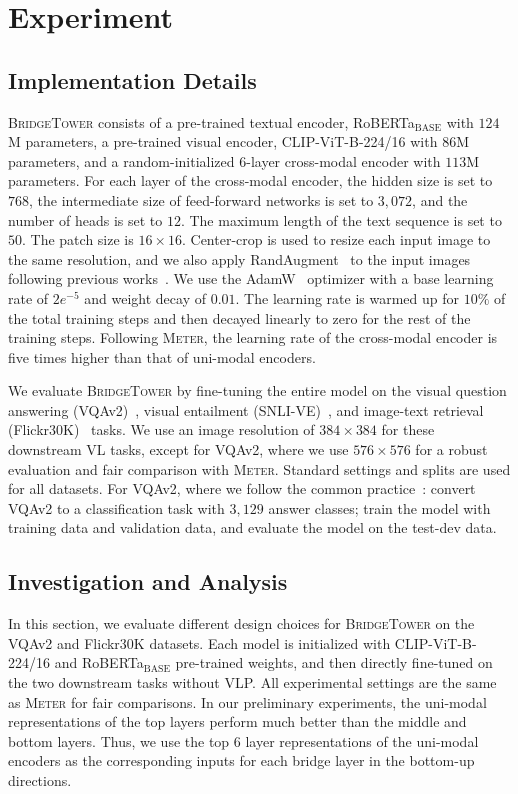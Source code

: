 \documentclass[letterpaper]{article} %
\newcommand{\methodname}[0]{\textsc{BridgeTower}}
\newcommand{\modelbase}[0]{$_{\text{BASE}}$}
\newcommand{\metername}[0]{\textsc{Meter}}
\begin{document}
\section{Experiment}

\subsection{Implementation Details}
\label{sec:implementation_details}
\methodname{} consists of a pre-trained textual encoder, RoBERTa\modelbase{} with $124$M parameters, a pre-trained visual encoder, CLIP-ViT-B-224/16 with $86$M parameters, and a random-initialized $6$-layer cross-modal encoder with $113$M parameters. For each layer of the cross-modal encoder, the hidden size is set to $768$, the intermediate size of feed-forward networks is set to $3,072$, and the number of heads is set to $12$. The maximum length of the text sequence is set to $50$.
The patch size is $16 \times 16$. Center-crop is used to resize each input image to the same resolution, and we also apply RandAugment~\citep{cubuk2020randaugment} to the input images following previous works~\citep{li2021align,dou2021meter}. 
We use the AdamW~\citep{loshchilov2018decoupled} optimizer with a base learning rate of $2e^{-5}$ and weight decay of $0.01$. The learning rate is warmed up for $10\%$ of the total training steps and then decayed linearly to zero for the rest of the training steps.
Following \metername{}, the learning rate of the cross-modal encoder is five times higher than that of uni-modal encoders.

We evaluate \methodname{} by fine-tuning the entire model on the visual question answering (VQAv2)~\citep{balanced_vqa_v2}, visual entailment (SNLI-VE)~\citep{xie2019visual}, and image-text retrieval (Flickr30K)~\citep{young-etal-2014-image} tasks.
We use an image resolution of $384 \times 384$ for these downstream VL tasks, except for VQAv2, where we use $576 \times 576$ for a robust evaluation and fair comparison with \metername{}. 
Standard settings and splits are used for all datasets. For VQAv2, where we follow the common practice~\citep{balanced_vqa_v2, teney2018tips}: convert VQAv2 to a classification task with $3,129$ answer classes; train the model with training data and validation data, and evaluate the model on the test-dev data.

\subsection{Investigation and Analysis}
\label{sec:investigation_and_analysis}
In this section, we evaluate different design choices for \methodname{} on the VQAv2 and Flickr30K datasets. 
Each model is initialized with CLIP-ViT-B-224/16 and RoBERTa\modelbase{} pre-trained weights, and then directly fine-tuned on the two downstream tasks without VLP.
All experimental settings are the same as \metername{} for fair comparisons.
In our preliminary experiments, the uni-modal representations of the top layers perform much better than the middle and bottom layers.
Thus, we use the top $6$ layer representations of the uni-modal encoders as the corresponding inputs for each bridge layer in the bottom-up directions.
\end{document}
